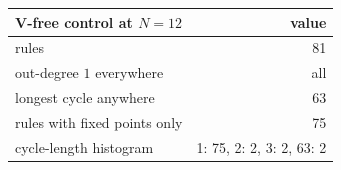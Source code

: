 \begin{tabular}{lr}
\toprule
V-free control at $N=12$ & value \\
\midrule
rules & 81 \\
out-degree $1$ everywhere & all \\
longest cycle anywhere & 63 \\
rules with fixed points only & 75 \\
cycle-length histogram & 1: 75, 2: 2, 3: 2, 63: 2 \\
\bottomrule
\end{tabular}
